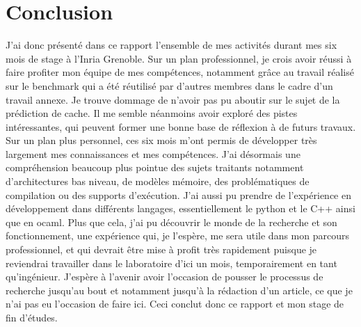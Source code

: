 \documentclass{report}
\begin{document}
\chapter{Conclusion}
J'ai donc présenté dans ce rapport l'ensemble de mes activités durant mes six mois de stage à l'Inria
Grenoble. Sur un plan professionnel, je crois avoir réussi à faire profiter mon équipe de mes compétences,
notamment grâce au travail réalisé sur le benchmark qui a été réutilisé par d'autres membres dans le cadre
d'un travail annexe. Je trouve dommage de n'avoir pas pu aboutir sur le sujet de la prédiction de cache. 
Il me semble néanmoins avoir exploré des pistes intéressantes, qui peuvent former une bonne
base de réflexion à de futurs travaux.
\\Sur un plan plus personnel, ces six mois m'ont permis de développer très largement mes connaissances et
mes compétences. J'ai désormais une compréhension beaucoup plus pointue des sujets traitants notamment
d'architectures bas niveau, de modèles mémoire, des problématiques de compilation ou des supports 
d'exécution. J'ai aussi pu prendre de l'expérience en développement dans différents langages,
essentiellement le python et le C++ ainsi que en ocaml. Plus que cela, j'ai pu découvrir le monde de la
recherche et son fonctionnement, une expérience qui, je l'espère, me sera utile dans mon parcours 
professionnel, et qui devrait être mise à profit très rapidement puisque je reviendrai travailler dans
le laboratoire d'ici un mois, temporairement en tant qu'ingénieur. J'espère à l'avenir avoir l'occasion
de pousser le processus de recherche jusqu'au bout et notamment jusqu'à la rédaction d'un article, ce
que je n'ai pas eu l'occasion de faire ici. Ceci conclut donc ce rapport et mon stage de fin d'études.
 

\end{document}
